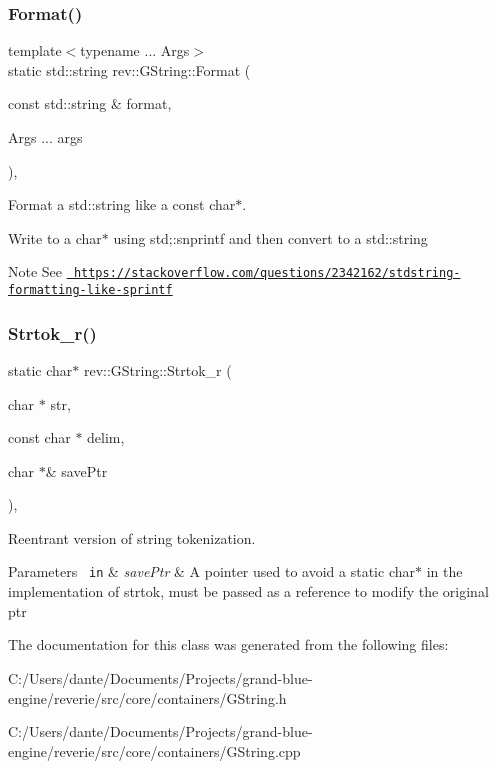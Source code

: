 \subsubsection{\texorpdfstring{Format()}{Format()}}
{\footnotesize\ttfamily template$<$typename ... Args$>$ \\
static std\+::string rev\+::\+G\+String\+::\+Format (\begin{DoxyParamCaption}\item[{const std\+::string \&}]{format,  }\item[{Args ...}]{args }\end{DoxyParamCaption})\hspace{0.3cm}{\ttfamily [inline]}, {\ttfamily [static]}}



Format a std\+::string like a const char$\ast$. 

Write to a char$\ast$ using std;\+:snprintf and then convert to a std\+::string \begin{DoxyNote}{Note}
See \href{https://stackoverflow.com/questions/2342162/stdstring-formatting-like-sprintf}{\texttt{ https\+://stackoverflow.\+com/questions/2342162/stdstring-\/formatting-\/like-\/sprintf}} 
\end{DoxyNote}
\mbox{\label{classrev_1_1_g_string_a5534bc69a6a2219cf84d0a05f420b25e}} 
\subsubsection{\texorpdfstring{Strtok\_r()}{Strtok\_r()}}
{\footnotesize\ttfamily static char$\ast$ rev\+::\+G\+String\+::\+Strtok\+\_\+r (\begin{DoxyParamCaption}\item[{char $\ast$}]{str,  }\item[{const char $\ast$}]{delim,  }\item[{char $\ast$\&}]{save\+Ptr }\end{DoxyParamCaption})\hspace{0.3cm}{\ttfamily [inline]}, {\ttfamily [static]}}



Reentrant version of string tokenization. 


\begin{DoxyParams}[1]{Parameters}
\mbox{\texttt{ in}}  & {\em save\+Ptr} & A pointer used to avoid a static char$\ast$ in the implementation of strtok, must be passed as a reference to modify the original ptr \\
\hline
\end{DoxyParams}


The documentation for this class was generated from the following files\+:\begin{DoxyCompactItemize}
\item 
C\+:/\+Users/dante/\+Documents/\+Projects/grand-\/blue-\/engine/reverie/src/core/containers/G\+String.\+h\item 
C\+:/\+Users/dante/\+Documents/\+Projects/grand-\/blue-\/engine/reverie/src/core/containers/G\+String.\+cpp\end{DoxyCompactItemize}
